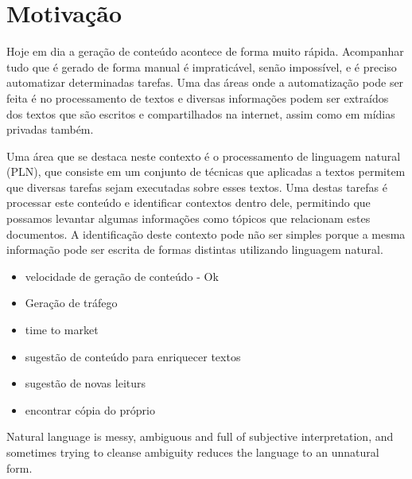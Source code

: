 \section{Motivação}

Hoje em dia a geração de conteúdo acontece de forma muito rápida. Acompanhar tudo que é gerado de forma manual é impraticável, senão impossível, e é
preciso automatizar determinadas tarefas. Uma das áreas onde a automatização pode ser feita é no processamento de textos e diversas informações podem ser 
extraídos dos textos que são escritos e compartilhados na internet, assim como em mídias privadas também.

Uma área que se destaca neste contexto é o processamento de linguagem natural (PLN), que consiste em um conjunto de técnicas que aplicadas a textos
permitem que diversas tarefas sejam executadas sobre esses textos. Uma destas tarefas é processar este conteúdo e identificar contextos dentro dele, 
permitindo que possamos levantar algumas informações como tópicos que relacionam estes documentos. A identificação deste contexto pode não ser simples
porque a mesma informação pode ser escrita de formas distintas utilizando linguagem natural.

\begin{itemize}
    \item velocidade de geração de conteúdo - Ok
    \item Geração de tráfego
    \item time to market
    \item sugestão de conteúdo para enriquecer textos
    \item sugestão de novas leiturs
    \item encontrar cópia do próprio
\end{itemize}

Natural language is messy, ambiguous and full of subjective interpretation, and sometimes trying to cleanse ambiguity reduces the language to an 
unnatural form.
